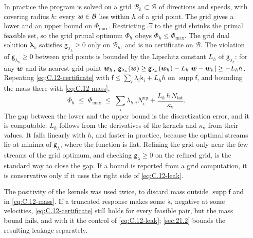 In practice the program is solved on a grid $\mathcal{B}_h \subset \mathcal{B}$ of directions and speeds, with covering radius $h$: every $\bm{w} \in \mathcal{B}$ lies within $h$ of a grid point. The grid gives a lower and an upper bound on $\Phi_{\max}$. Restricting $\Xi$ to the grid shrinks the primal feasible set, so the grid primal optimum $\Phi_h$ obeys $\Phi_h \le \Phi_{\max}$. The grid dual solution $\boldsymbol{\lambda}_h$ satisfies $\mathsf{g}_{\lambda_h} \ge 0$ only on $\mathcal{B}_h$, and is no certificate on $\mathcal{B}$. The violation of $\mathsf{g}_{\lambda_h} \ge 0$ between grid points is bounded by the Lipschitz constant $L_h$ of $\mathsf{g}_{\lambda_h}$: for any $\bm{w}$ and its nearest grid point $\bm{w}_h$, $\mathsf{g}_{\lambda_h}(\bm{w}) \ge \mathsf{g}_{\lambda_h}(\bm{w}_h) - L_h|\bm{w} - \bm{w}_h| \ge -L_hh$. Repeating \cref{eq:C.12-certificate} with $\mathsf{f} \le \sum_i\lambda_i\mathsf{k}_i + L_hh$ on $\operatorname{supp}\mathsf{f}$, and bounding the mass there with \cref{eq:C.12-mass},
\begin{equation}
  \Phi_h \;\le\; \Phi_{\max} \;\le\; \sum_i\lambda_{h,i}N_i^{\mathrm{up}} + \frac{L_h\,h\,N_{\mathrm{tot}}}{\kappa_{\mathrm{v}}} .
  \label{eq:C.12-leak}
\end{equation}
The gap between the lower and the upper bound is the discretization error, and it is computable: $L_h$ follows from the derivatives of the kernels and $\kappa_{\mathrm{v}}$ from their values. It falls linearly with $h$, and faster in practice, because the optimal streams lie at minima of $\mathsf{g}_\lambda$, where the function is flat. Refining the grid only near the few streams of the grid optimum, and checking $\mathsf{g}_\lambda \ge 0$ on the refined grid, is the standard way to close the gap. If a bound is reported from a grid computation, it is conservative only if it uses the right side of \cref{eq:C.12-leak}.

The positivity of the kernels was used twice, to discard mass outside $\operatorname{supp}\mathsf{f}$ and in \cref{eq:C.12-mass}. If a truncated response makes some $\mathsf{k}_i$ negative at some velocities, \cref{eq:C.12-certificate} still holds for every feasible pair, but the mass bound fails, and with it the control of \cref{eq:C.12-leak}; \cref{sec:21.2} bounds the resulting leakage separately.
